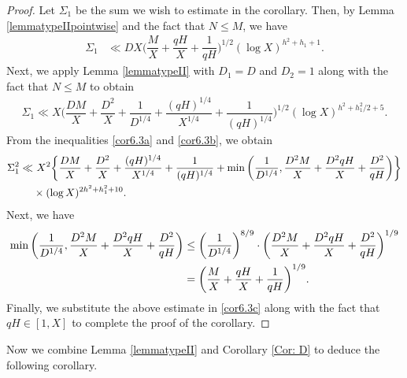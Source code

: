 \documentclass[12pt]{amsart}
\numberwithin{equation}{section}
\theoremstyle{remark}
\theoremstyle{definition}
\begin{document}
\begin{proof}
Let $\Sigma_1$ be the sum we wish to estimate in the corollary. Then, by Lemma \ref{lemmatypeIIpointwise} and the fact that $N\leq M$, we have
\begin{align}
\label{cor6.3a}\Sigma_1
&\ll DX\bigg(\dfrac{M}{X} + \dfrac{qH}{X} + \dfrac{1}{qH}\bigg)^{1/2}(\log X)^{h^2 + h_1+1}.
\end{align}
Next, we apply Lemma \ref{lemmatypeII} with $D_1=D$ and $D_2=1$ along with the fact that $N\leq M$ to obtain
\begin{align}\label{cor6.3b}
\Sigma_1 \ll  X\bigg(\dfrac{DM}{X} + \dfrac{D^2}{X} + \dfrac{1}{D^{1/4}} + \dfrac{(qH)^{1/4}}{X^{1/4}} + \dfrac{1}{(qH)^{1/4}}\bigg)^{1/2}(\log X)^{h^2+h_1^2/2+5}.
\end{align}
From the inequalities \eqref{cor6.3a} and \eqref{cor6.3b}, we obtain
\begin{align}\label{cor6.3c}
\Sigma_1^2  \ll &~X^2\bigg\{\dfrac{DM}{X} + \dfrac{D^2}{X} +\dfrac{(qH)^{1/4}}{X^{1/4}} + \dfrac{1}{(qH)^{1/4}} + \min\bigg(\dfrac{1}{D^{1/4}}, \dfrac{D^2M}{X} + \dfrac{D^2qH}{X} + \dfrac{D^2}{qH}\bigg)\bigg\}\\
\notag &\times (\log X)^{2h^2+h_1^2+10}.
\end{align}
Next, we have
\begin{align}
\notag \min\bigg(\dfrac{1}{D^{1/4}}, \dfrac{D^2M}{X} + \dfrac{D^2qH}{X} + \dfrac{D^2}{qH}\bigg) &\leq \bigg(\dfrac{1}{D^{1/4}}\bigg)^{8/9}\cdot \bigg(\dfrac{D^2M}{X} + \dfrac{D^2qH}{X} + \dfrac{D^2}{qH}\bigg)^{1/9}\\
\notag &=\bigg(\dfrac{M}{X} + \dfrac{qH}{X} + \dfrac{1}{qH}\bigg)^{1/9}.
\end{align}
Finally, we substitute the above estimate in \eqref{cor6.3c} along with the fact that $qH\in [1, X]$ to complete the proof of the corollary.
\end{proof}



Now we combine Lemma \ref{lemmatypeII} and Corollary \ref{Cor: D} to deduce the following corollary.
\end{document}
